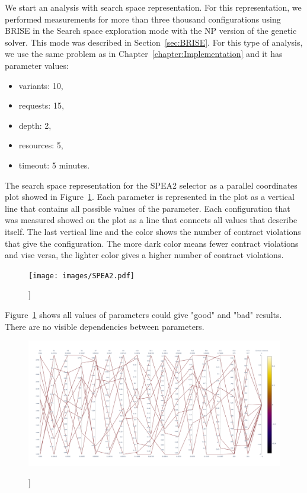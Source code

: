 We start an analysis with search space representation. For this representation, we performed measurements for more than three thousand configurations using BRISE in the Search space exploration mode with the NP version of the genetic solver. This mode was described in Section~\ref{sec:BRISE}. For this type of analysis, we use the same problem as in Chapter~\ref{chapter:Implementation} and it has parameter values:
\begin{itemize}
	\item variants: 10,
	\item requests: 15,
	\item depth: 2,
	\item resources: 5,
	\item timeout: 5 minutes.
\end{itemize}

The search space representation for the SPEA2 selector as a parallel coordinates plot showed in Figure~\ref{fig:SearchSpaceViewFull}.
Each parameter is represented in the plot as a vertical line that contains all possible values of the parameter. Each configuration that was measured showed on the plot as a line that connects all values that describe itself. The last vertical line and the color shows the number of contract violations that give the configuration. The more dark color means fewer contract violations and vise versa, the lighter color gives a higher number of contract violations.

\begin{figure}
	\centering
	\texttt{[image: images/SPEA2.pdf]}
	\caption[]]{}
	\label{fig:SearchSpaceViewFull}
\end{figure}

Figure~\ref{fig:SearchSpaceViewFull} shows all values of parameters could give "good" and "bad" results. There are no visible dependencies between parameters. 

\begin{figure}
	\centering
	\includegraphics[width=\textwidth]{images/SPEA2_Zero_validity.html.pdf}
	\caption[]]{}
	\label{fig:SearchSpaceValid}
\end{figure}

